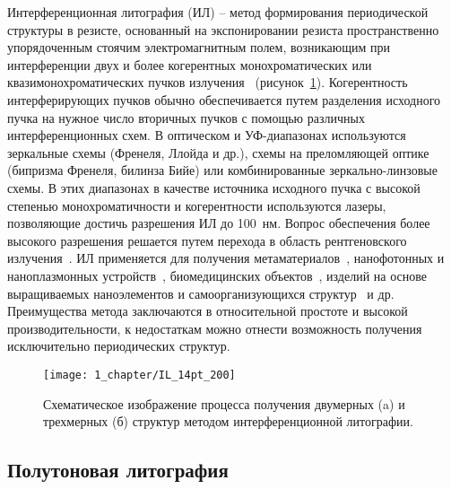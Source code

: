 Интерференционная литография (ИЛ) -- метод формирования периодической структуры в резисте, основанный на экспонировании резиста пространственно упорядоченным стоячим электромагнитным полем, возникающим при интерференции двух и более когерентных монохроматических или квазимонохроматических пучков излучения~\cite{IL_general} (рисунок~\ref{fig:IL}). Когерентность интерферирующих пучков обычно обеспечивается путем разделения исходного пучка на нужное число вторичных пучков с помощью различных интерференционных схем. В оптическом и УФ-диапазонах используются зеркальные схемы (Френеля, Ллойда и др.), схемы на преломляющей оптике (бипризма Френеля, билинза Бийе) или комбинированные зеркально-линзовые схемы. В этих диапазонах в качестве источника исходного пучка с высокой степенью монохроматичности и когерентности используются лазеры, позволяющие достичь разрешения ИЛ до 100~нм. Вопрос обеспечения более высокого разрешения решается путем перехода в область рентгеновского излучения~\cite{IL_X-ray}. ИЛ применяется для получения  метаматериалов~\cite{IL_metamaterials}, нанофотонных и наноплазмонных устройств~\cite{IL_nanophotonics}, биомедицинских объектов~\cite{IL_biomedical}, изделий на основе выращиваемых наноэлементов и самоорганизующихся структур~\cite{IL_self-assembly} и др. Преимущества метода заключаются в относительной простоте и высокой производительности, к недостаткам можно отнести возможность получения исключительно периодических структур.

\begin{figure}[t]
	\centering
	\texttt{[image: 1\_chapter/IL\_14pt\_200]}
	\vspace{0.5em}
	\caption{Схематическое изображение процесса получения двумерных (a) и трехмерных (б) структур методом интерференционной литографии.}
	\label{fig:IL}
\end{figure}


\subsection{Полутоновая литография}

